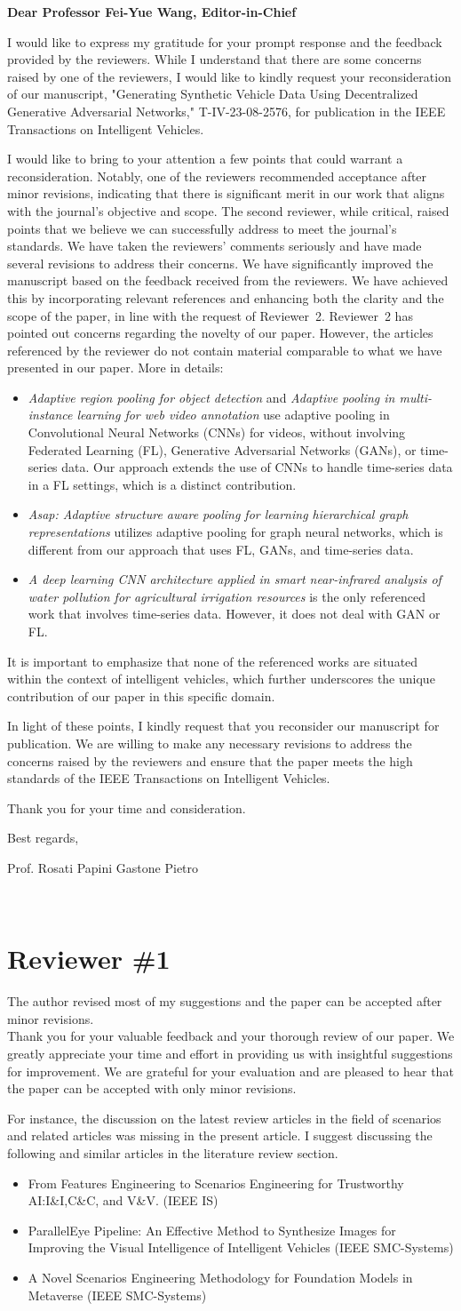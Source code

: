 \documentclass{article}
\def\Editor{Dear Professor Fei-Yue Wang, Editor-in-Chief}
\def\Letter{
 I would like to express my gratitude for your prompt response and the feedback provided by the reviewers. While I understand that there are some concerns raised by one of the reviewers, I would like to kindly request your reconsideration of our manuscript, "Generating Synthetic Vehicle Data Using Decentralized Generative Adversarial Networks," T-IV-23-08-2576, for publication in the IEEE Transactions on Intelligent Vehicles.

I would like to bring to your attention a few points that could warrant a reconsideration. 
Notably, one of the reviewers recommended acceptance after minor revisions, indicating that there is significant merit in our work that aligns with the journal's objective and scope. The second reviewer, while critical, raised points that we believe we can successfully address to meet the journal's standards. We have taken the reviewers' comments seriously and have made several revisions to address their concerns. %
We have significantly improved the manuscript based on the feedback received from the reviewers. We have achieved this by incorporating relevant references and enhancing both the clarity and the scope of the paper, in line with the request of Reviewer~2. Reviewer~2 has pointed out concerns regarding the novelty of our paper. However, the articles referenced by the reviewer do not contain material comparable to what we have presented in our paper. More in details:%
\begin{itemize}
\item \emph{Adaptive region pooling for object detection} and \emph{Adaptive pooling in multi-instance learning for web video annotation} use adaptive pooling in Convolutional Neural Networks (CNNs) for videos, without involving Federated Learning (FL), Generative Adversarial Networks (GANs), or time-series data. Our approach extends the use of CNNs to handle time-series data in a FL settings, which is a distinct contribution. 
\item \emph{Asap: Adaptive structure aware pooling for learning hierarchical graph representations} utilizes adaptive pooling for graph neural networks, which is different from our approach that uses FL, GANs, and time-series data.
\item \emph{A deep learning CNN architecture applied in smart near-infrared analysis of water pollution for agricultural irrigation resources} is the only referenced work that involves time-series data. However, it does not deal with GAN or FL.
\end{itemize}
It is important to emphasize that none of the referenced works are situated within the context of intelligent vehicles, which further underscores the unique contribution of our paper in this specific domain.


In light of these points, I kindly request that you reconsider our manuscript for publication. We are willing to make any necessary revisions to address the concerns raised by the reviewers and ensure that the paper meets the high standards of the IEEE Transactions on Intelligent Vehicles.

Thank you for your time and consideration.

Best regards,

Prof. Rosati Papini Gastone Pietro
}
\providecommand{\Editor}{Name}
\providecommand{\Letter}{Body}
\begin{document}
{\Large\bf \Editor}\\[1em]
{\large\Letter}\\[1em]
\headall










\section{Reviewer \#1}

\RC The author revised most of my suggestions and the paper can be accepted after minor revisions. \\

\AR Thank you for your valuable feedback and your thorough review of our paper. We greatly appreciate your time and effort in providing us with insightful suggestions for improvement. We are grateful for your evaluation and are pleased to hear that the paper can be accepted with only minor revisions.

\RC For instance, the discussion on the latest review articles in the field of scenarios and related articles was missing in the present article. I suggest discussing the following and similar articles in the literature review section.
\begin{itemize}
	\item From Features Engineering to Scenarios Engineering for Trustworthy AI:I\&I,C\&C, and V\&V. (IEEE IS)
	\item ParallelEye Pipeline: An Effective Method to Synthesize Images for Improving the Visual Intelligence of Intelligent Vehicles (IEEE SMC-Systems)
	\item A Novel Scenarios Engineering Methodology for Foundation Models in Metaverse (IEEE SMC-Systems)
\end{itemize}
\end{document}
